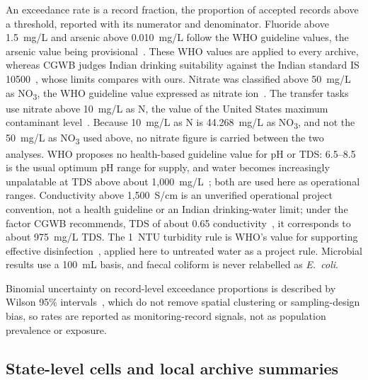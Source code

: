 \documentclass[10pt,letterpaper]{article}
\begin{document}
An exceedance rate is a record fraction, the proportion of accepted records above a threshold, reported with its numerator and denominator. Fluoride above 1.5~mg/L and arsenic above 0.010~mg/L follow the WHO guideline values, the arsenic value being provisional~\cite{WHO2022GDWQ}. These WHO values are applied to every archive, whereas CGWB judges Indian drinking suitability against the Indian standard IS 10500~\cite{CGWB-AGWQR2025}, whose limits  compares with ours. Nitrate was classified above 50~mg/L as NO\textsubscript{3}, the WHO guideline value expressed as nitrate ion~\cite{WHO2022GDWQ}. The transfer tasks use nitrate above 10~mg/L as N, the value of the United States maximum contaminant level~\cite{USEPA-NPDWR}. Because 10~mg/L as N is 44.268~mg/L as NO\textsubscript{3}, and not the 50~mg/L as NO\textsubscript{3} used above, no nitrate figure is carried between the two analyses. WHO proposes no health-based guideline value for pH or TDS: 6.5--8.5 is the usual optimum pH range for supply, and water becomes increasingly unpalatable at TDS above about 1,000~mg/L~\cite{WHO2022GDWQ}; both are used here as operational ranges. Conductivity above 1,500~\textmu{}S/cm is an unverified operational project convention, not a health guideline or an Indian drinking-water limit; under the factor CGWB recommends, TDS of about 0.65 \texttimes{} conductivity~\cite{CGWB-SOP-GWQDataAnalysis}, it corresponds to about 975~mg/L TDS. The 1~NTU turbidity rule is WHO's value for supporting effective disinfection~\cite{WHO2022GDWQ}, applied here to untreated water as a project rule. Microbial results use a 100~mL basis, and faecal coliform is never relabelled as \textit{E.~coli}.

Binomial uncertainty on record-level exceedance proportions is described by Wilson 95\% intervals~\cite{Brown2001}, which do not remove spatial clustering or sampling-design bias, so rates are reported as monitoring-record signals, not as population prevalence or exposure.

\subsection*{State-level cells and local archive summaries}
\end{document}
